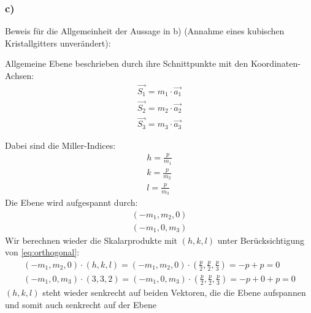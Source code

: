 \documentclass[11pt]{article}
\begin{document}
\subsubsection*{c)}

Beweis für die Allgemeinheit der Aussage in b) (Annahme eines kubischen Kristallgitters unverändert):

Allgemeine Ebene beschrieben durch ihre Schnittpunkte mit den Koordinaten- Achsen:
\begin{align*}
\vec{S_1} = m_1\cdot \vec{a_1} \\
\vec{S_2} = m_2\cdot\vec{a_2}\\
\vec{S_3} = m_3\cdot\vec{a_3}
\end{align*}

Dabei sind die Miller-Indices:
\begin{align*}
h = \frac{p}{m_1}\\
k = \frac{p}{m_2}\\
l = \frac{p}{m_3}
\end{align*}
Die Ebene wird aufgespannt durch:
 \begin{align*}
(-m_1,m_2,0)\\
(-m_1,0,m_3)
\end{align*}
Wir berechnen wieder die Skalarprodukte mit $(h,k,l)$ unter Berücksichtigung von \eqref{eq:orthogonal}:
\begin{align*}
(-m_1,m_2,0)\cdot(h,k,l)=(-m_1,m_2,0)\cdot\left(\frac{p}{2},\frac{p}{2},\frac{p}{3}\right)=-p+p=0\\
(-m_1,0,m_3)\cdot(3,3,2)=(-m_1,0,m_3)\cdot\left(\frac{p}{2},\frac{p}{2},\frac{p}{3}\right)=-p+0+p=0
\end{align*}
$(h,k,l)$ steht wieder senkrecht auf beiden Vektoren, die die Ebene aufspannen und somit auch senkrecht auf der Ebene
\end{document}
